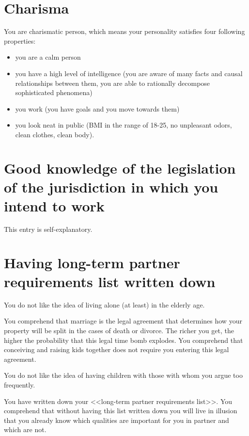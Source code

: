\documentclass[11pt]{article}
\theoremstyle{remark}
\theoremstyle{definition}
\begin{document}
\section{Charisma}




You are charismatic person, which means your personality satisfies four following properties:

\begin{itemize}
\item you are a calm person
\item you have a high level of intelligence (you are aware of many facts and causal relationships between them, you are able to rationally decompose sophisticated phenomena)
\item you work (you have goals and you move towards them)
\item you look neat in public (BMI in the range of 18-25, no unpleasant odors, clean clothes, clean body).
\end{itemize}

\section{Good knowledge of the legislation of the jurisdiction in which you intend to work}

This entry is self-explanatory.


\section{Having long-term partner requirements list written down}





You do not like the idea of living alone (at least) in the elderly age.


You comprehend that marriage is the legal agreement that determines how your property will be split in the cases of death or divorce. The richer you get, the higher the probability that this legal time bomb explodes. You comprehend that conceiving and raising kids together does not require you entering this legal agreement.

You do not like the idea of having children with those with whom you argue too frequently.



You have written down your <<long-term partner requirements list>>. You comprehend that without having this list written down you will live in illusion that you already know which qualities are important for you in partner and which are not. 
\end{document}
